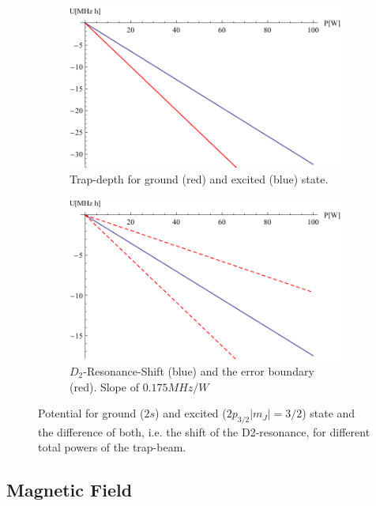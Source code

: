 \begin{figure}[h]
\centering
\begin{subfigure}[b]{0.4\textwidth}
                \includegraphics[width=\textwidth]{shift}
                \caption{Trap-depth for ground (red) and excited (blue) state.}
\end{subfigure}
\begin{subfigure}[b]{0.4\textwidth}
               \includegraphics[width=\textwidth]{difshifterror}
                \caption{$D_2$-Resonance-Shift (blue) and the error boundary (red). Slope of $0.175\unit{MHz/W}$}
\end{subfigure}


\caption{Potential for ground ($2s$) and excited ($2p_{3/2}$$|m_J|=3/2$) state and the difference of both, i.e. the shift of the D2-resonance, for different total powers of the trap-beam.}
\label{potential}
\end{figure}


\subsection{Magnetic Field}




